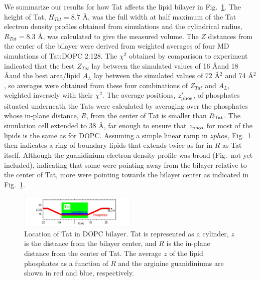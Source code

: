 We summarize our results for how Tat affects the lipid bilayer in Fig.~\ref{fig:figure9}. 
The height of Tat, $H_{Tat} = 8.7$ \AA, was the full width at half maximum of 
the Tat electron density profiles
obtained from simulations and the cylindrical radius, $R_{Tat} = 8.3$ \AA, was 
calculated to give the
measured volume. The $Z$ distances from the center of the bilayer were derived 
from weighted
averages of four MD simulations of Tat:DOPC 2:128. The $\chi^2$ obtained by 
comparison to
experiment indicated that the best $Z_{Tat}$ lay between the simulated values 
of 16 \AA and 18 \AA and
the best area/lipid $A_L$ lay between the simulated values of 72 \AA$^2$ and 
74 \AA$^2$, 
so averages were
obtained from these four combinations of $Z_{Tat}$ and $A_L$, weighted inversely 
with their $\chi^2$. The
average positions, $z_\textrm{phos}'$, of phosphates situated underneath the Tats were calculated by
averaging over the phosphates whose in-plane distance, $R$, from the center of Tat is smaller than
$R_\textrm{Tat}$. The simulation cell extended to 38 \AA, far enough to ensure that $z_\textrm{phos}$ for most of the lipids is
the same as for DOPC. Assuming a simple linear ramp in $zphos$, Fig.~\ref{fig:figure9} then indicates a ring of
boundary lipids that extends twice as far in $R$ as Tat itself. Although the guanidinium electron
density profile was broad (Fig.~not yet included), indicating that some were pointing away from the bilayer
relative to the center of Tat, more were pointing towards the bilayer center as indicated in Fig.~\ref{fig:figure9}.

\begin{figure}[htbp]
  \centering
  \includegraphics[width=0.5\textwidth]{figures/Tat/figure9}
  \caption{Location of Tat in DOPC bilayer. Tat is represented as a cylinder, $z$ is the distance
  from the bilayer center, and $R$ is the in-plane distance from the center of Tat. The average $z$ of
  the lipid phosphates as a function of $R$ and the arginine guanidiniums are shown in red and blue,
  respectively.}
  \label{fig:figure9}
\end{figure}

